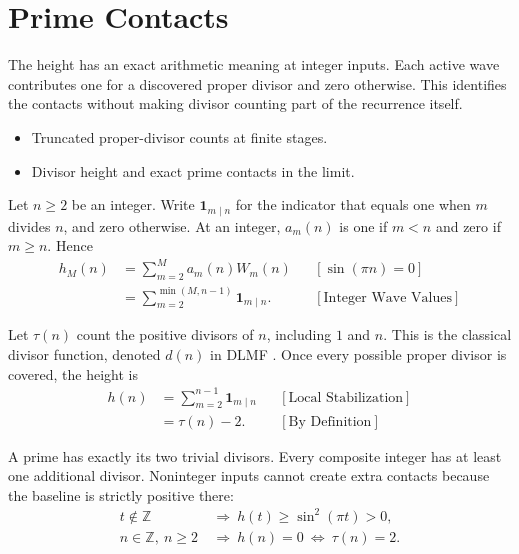 \section{Prime Contacts}
The height has an exact arithmetic meaning at integer inputs. Each active
wave contributes one for a discovered proper divisor and zero otherwise.
This identifies the contacts without making divisor counting part of the
recurrence itself.

\begin{itemize}
\item Truncated proper-divisor counts at finite stages.
\item Divisor height and exact prime contacts in the limit.
\end{itemize}

Let $n\ge2$ be an integer. Write $\mathbf 1_{m\mid n}$ for the indicator
that equals one when $m$ divides $n$, and zero otherwise. At an integer,
$a_m(n)$ is one if $m < n$ and zero if $m\ge n$. Hence
\begin{equation*}
\begin{aligned}
h_M(n)
&=\sum_{m=2}^{M}a_m(n)W_m(n)
&&[\sin(\pi n)=0]\\
&=\sum_{m=2}^{\min(M,n-1)}\mathbf 1_{m\mid n}.
&&[\text{Integer Wave Values}]
\end{aligned}
\end{equation*}

Let $\tau(n)$ count the positive divisors of $n$, including $1$ and $n$.
This is the classical divisor function, denoted $d(n)$ in DLMF \cite{dlmfdivisors}.
Once every possible proper divisor is covered, the height is
\begin{equation*}
\begin{aligned}
h(n)&=\sum_{m=2}^{n-1}\mathbf 1_{m\mid n}
&&[\text{Local Stabilization}]\\
&=\tau(n)-2.
&&[\text{By Definition}]
\end{aligned}
\end{equation*}

A prime has exactly its two trivial divisors. Every composite integer has
at least one additional divisor. Noninteger inputs cannot create extra
contacts because the baseline is strictly positive there:
\begin{equation*}
\begin{aligned}
t\notin\mathbb Z&\ \Longrightarrow\ h(t)\ge\sin^2(\pi t) > 0,\\
n\in\mathbb Z,\ n\ge2&\ \Longrightarrow\
h(n)=0\ \Longleftrightarrow\ \tau(n)=2.
\end{aligned}
\end{equation*}

